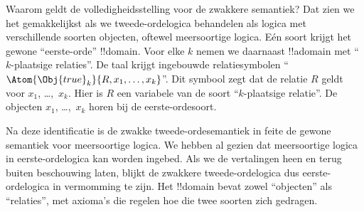\documentclass[../../../include/open-logic-section]{subfiles}
\begin{document}
Waarom geldt de volledigheidsstelling voor de zwakkere semantiek? Dat zien we
het gemakkelijkst als we tweede-ordelogica behandelen als logica met
verschillende soorten objecten, oftewel meersoortige logica. Eén soort krijgt
het gewone ``eerste-orde'' !!{domain}. Voor elke $k$ nemen we daarnaast
!!a{domain} met ``$k$-plaatsige relaties''. De taal krijgt ingebouwde
relatiesymbolen ``$\Atom{\Obj{true}_k}{R,x_1,\dots,x_k}$''. Dit symbool zegt
dat de relatie $R$ geldt voor $x_1$, \dots,~$x_k$. Hier is $R$ een variabele
van de soort ``$k$-plaatsige relatie''. De objecten $x_1$, \dots,~$x_k$
horen bij de eerste-ordesoort.

Na deze identificatie is de zwakke tweede-ordesemantiek in feite de gewone
semantiek voor meersoortige logica. We hebben al gezien dat meersoortige
logica in eerste-ordelogica kan worden ingebed. Als we de vertalingen heen en
terug buiten beschouwing laten, blijkt de zwakkere tweede-ordelogica dus
eerste-ordelogica in vermomming te zijn. Het !!{domain} bevat zowel
``objecten'' als ``relaties'', met axioma's die regelen hoe die twee soorten
zich gedragen.
\end{document}
